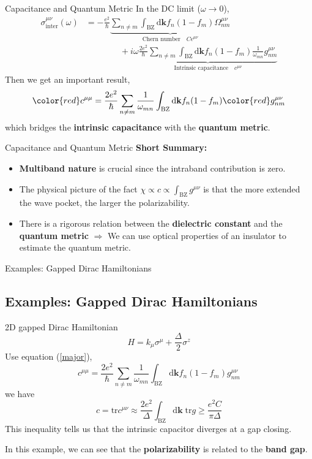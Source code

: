 \documentclass[professionalfont]{beamer}
\newcommand{\mrm}[1]{\mathrm{#1}}
\newcommand{\bo}[1]{\mathbf{#1}}
\begin{document}
\begin{frame}{Capacitance and Quantum Metric}
In the DC limit ($\omega\to 0$),
{\footnotesize
\begin{align*}
\sigma^{\mu\nu}_{\mrm{inter}}(\omega) &= -\frac{e^2}{\hbar}\underbrace{\sum_{n\neq m}\int_{\mrm{BZ}}\mrm{d}\bo{k}f_n(1-f_m)\Omega^{\mu\nu}_{nm}}_{\text{Chern number}\quad C\epsilon^{\mu\nu}}\\
&\quad\quad\quad\quad + i\omega\underbrace{\frac{2e^2}{\hbar}\sum_{n\neq m}\int_{\mrm{BZ}}\mrm{d}\bo{k}f_n(1-f_m)\frac{1}{\omega_{mn}}g^{\mu\nu}_{nm}}_{\text{Intrinsic capacitance}\quad c^{\mu\nu}}
\end{align*}
}
Then we get an important result,
\begin{equation}\label{major}
{\color{red}c^{\mu\mu}} = \frac{2e^2}{\hbar}\sum_{n\neq m}\frac{1}{\omega_{mn}}\int_{\mrm{BZ}}\mrm{d}\bo{k}f_n(1-f_m){\color{red}g^{\mu\nu}_{nm}}
\end{equation}
which bridges the \textbf{intrinsic capacitance} with the \textbf{quantum metric}.
\end{frame}
\begin{frame}{Capacitance and Quantum Metric}
\textbf{Short Summary:}
\begin{itemize}
    \item \textbf{Multiband nature} is crucial since the intraband contribution is zero.
    \item The physical picture of the fact  $\chi \propto c\propto \int_{\mrm{BZ}}g^{\mu\nu}$ is that the more extended the wave pocket, the larger the polarizability.
    \item There is a rigorous relation between the \textbf{dielectric constant} and the \textbf{quantum metric} $\Longrightarrow$ We can use optical properties of an insulator to estimate the quantum metric.
    
\end{itemize}

\end{frame}
\begin{frame}{Examples: Gapped Dirac Hamiltonians}
\subsection{Examples: Gapped Dirac Hamiltonians}
2D gapped Dirac Hamiltonian
\[
H = k_\mu\sigma^\mu+\frac{\Delta}{2}\sigma^z
\]
Use equation (\ref{major}), 
\[
c^{\mu\mu} = \frac{2e^2}{\hbar}\sum_{n\neq m}\frac{1}{\omega_{mn}}\int_{\mrm{BZ}}\mrm{d}\bo{k}f_n(1-f_m) g^{\mu\nu}_{nm}
\]
we have
\[
c=\mrm{tr}c^{\mu\nu} \approx \frac{2e^2}{\Delta}\int_{\mrm{BZ}}\mrm{d}\bo{k}\;\mrm{tr}g \geq \frac{e^2C}{\pi\Delta}
\]
This inequality tells us that the intrinsic capacitor diverges at a gap closing.

In this example, we can see that the \textbf{polarizability} is related to the \textbf{band gap}.

\end{frame}
\end{document}
